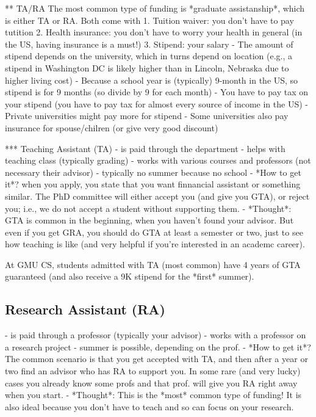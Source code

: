 \documentclass[10pt]{article}
\begin{document}
** TA/RA
The most common type of funding is *graduate assistanship*, which is either TA or RA. Both come with
1. Tuition waiver: you don't have to pay tutition
2. Health insurance: you don't have to worry your health in general (in the US, having insurance is a must!)
3. Stipend: your salary  
  - The amount of stipend depends on the university, which in turns depend on location (e.g., a stipend in Washington DC is likely higher than in Lincoln, Nebraska due to higher living cost)
  - Because a school year is (typically) 9-month in the US, so stipend is for 9 months (so divide by 9 for each month)
  - You have to pay tax on your stipend (you have to pay tax for almost every source of income in the US)
  - Private universities might pay more for stipend    
- Some universities also pay insurance for spouse/chilren (or give very good discount)



*** Teaching Assistant (TA)
- is paid through the department
- helps with teaching class (typically grading)
- works with various courses and professors (not necessary their advisor)
- typically no summer because no school
- *How to get it*?  when you apply, you state that you want finnancial assistant or something similar. The PhD committee will either accept you (and give you GTA), or reject you; i.e., we do not accept a student without supporting them.
- *Thought*: GTA is common in the beginning, when you haven't found your advisor.  But even if you get GRA, you should do GTA at least a semester or two, just to see how teaching is like (and very helpful if you're interested in an academc career).

\begin{tcolorbox}[left=1pt,right=1pt,top=1pt,bottom=1pt]
At GMU CS, students admitted with TA (most common) have  4 years of GTA guaranteed (and also receive a 9K stipend for the *first* summer).
\end{tcolorbox}

\subsection{Research Assistant (RA)}
- is paid through a professor (typically your advisor)
- works with a professor on a research project
- summer is possible, depending on the prof.
- *How to get it*?  The common scenario is that you get accepted with TA, and then after a year or two find an advisor who has RA to support you. In some rare (and very lucky) cases you already know some profs  and that prof. will give you RA right away when you start.
- *Thought*: This is the *most* common type of funding!  It is also ideal because you don't have to teach and so can focus on your research.
    
\end{document}
